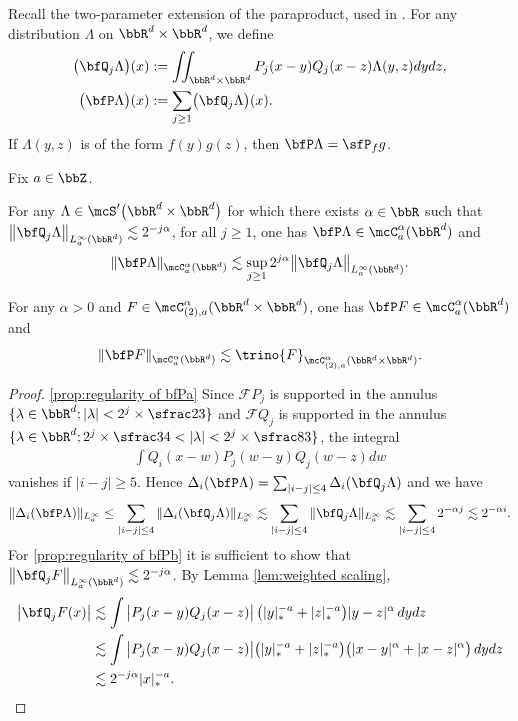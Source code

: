 Recall the two-parameter extension of the paraproduct, used in \cite{BH}. For any distribution $\Lambda$ on $\bbR^d\times \bbR^d$, we define
\begin{align*}
\bigl(\bfQ_j \Lambda\bigr)(x) &:= \iint_{\bbR^d\times\bbR^d} P_j(x-y)Q_j(x-z) \Lambda(y,z)dydz, \\
\bigl(\bfP \Lambda\bigr)(x) &:= \sum_{j\ge1} \bigl(\bfQ_j\Lambda\bigr)(x).
\end{align*}
If $\Lambda(y,z)$ is of the form $f(y)g(z)$, then $\bfP \Lambda=\sfP_fg$.

\begin{prop}[{\cite[Prop.\,8(a)]{BH}}]
\label{prop:regularity of bfP}
Fix $a\in\bbZ$.
\begin{enumeratea}
	\item\label{prop:regularity of bfPa} For any $\Lambda\in\mcS'\bigl(\bbR^d\times\bbR^d\bigr)$ for which there exists $\alpha\in\bbR$ such that $\big\|\bfQ_j\Lambda\big\|_{L_a^\infty(\bbR^d)}\lesssim2^{-j\alpha}$, for all $j\ge1$, one has $\bfP\Lambda\in \mcC_a^\alpha(\bbR^d)$ and
\[
\|\bfP\Lambda\|_{\mcC_a^\alpha(\bbR^d)} \lesssim\sup_{j\ge1}2^{j\alpha} \big\|\bfQ_j\Lambda\big\|_{L_a^\infty(\bbR^d)}.
\]
	\item\label{prop:regularity of bfPb} For any $\alpha>0$ and $F\in\mcC_{(2),a}^\alpha(\bbR^d\times\bbR^d)$, one has $\bfP F\in \mcC_a^\alpha(\bbR^d)$ and
\[
\|\bfP F\|_{\mcC_a^\alpha(\bbR^d)}\lesssim\trino{F}_{\mcC_{(2),a}^\alpha(\bbR^d\times\bbR^d)}.
\]
\end{enumeratea}
\end{prop}

\skpt
\begin{proof}
\eqref{prop:regularity of bfPa} Since $\mathscr{F} P_j$ is supported in the annulus $\{\lambda\in\bbR^d ; |\lambda|<2^j\times\sfrac23\}$ and $\mathscr{F} Q_j$ is supported in the annulus $\{\lambda\in\bbR^d ; 2^j\times\sfrac34 < |\lambda| < 2^j\times\sfrac83\}$, the integral
\begin{align*}
\int Q_i(x-w)P_j(w-y)Q_j(w-z)dw
\end{align*}
vanishes if $|i-j|\ge5$. Hence $\Delta_i({\bfP} \Lambda)=\sum_{|i-j|\le4}\Delta_i(\bfQ_j\Lambda)$ and we have
\[
\|\Delta_i({\bfP} \Lambda)\|_{L^\infty_a}
\le\sum_{|i-j|\le4}\|\Delta_i(\bfQ_j\Lambda)\|_{L^\infty_a}
\lesssim\sum_{|i-j|\le4}\|\bfQ_j\Lambda\|_{L^\infty_a}
\lesssim\sum_{|i-j|\le4}2^{-\alpha j}
\lesssim2^{-\alpha i}.
\]
For \eqref{prop:regularity of bfPb} it is sufficient to show that $\big\|\bfQ_jF\big\|_{L_a^\infty(\bbR^d)}\lesssim2^{-j\alpha}$. By Lemma \ref{lem:weighted scaling},
\begin{align*}
\big|\bfQ_jF(x)\big| &\lesssim \int \big|P_j(x-y)Q_j(x-z)\big| \,\bigl(|y|_*^{-a}+|z|_*^{-a}\bigr) |y-z|^\alpha\, dydz \\
&\lesssim \int \big|P_j(x-y)Q_j(x-z)\big| \bigl(|y|_*^{-a}+|z|_*^{-a}\bigr) \bigl(|x-y|^\alpha+|x-z|^\alpha\bigr) \,dydz \\
&\lesssim2^{-j\alpha}|x|_*^{-a}.\qedhere
\end{align*}
\end{proof}

